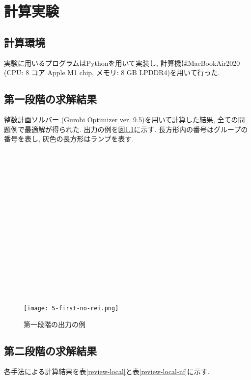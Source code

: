 \chapter{計算実験}\label{computational_result}
\section{計算環境}
実験に用いるプログラムはPythonを用いて実装し, 計算機はMacBookAir2020 (CPU: 8 コア Apple M1 chip, メモリ: 8 GB LPDDR4)を用いて行った. 

\section{第一段階の求解結果}
整数計画ソルバー (Gurobi Optimizer ver. 9.5)を用いて計算した結果, 全ての問題例で最適解が得られた. 
出力の例を図\ref{first-no-rei}に示す. 
長方形内の番号はグループの番号を表し, 灰色の長方形はランプを表す. \\
\\ \\ \\ \\ \\ \\ \\ \\  
\\ \\ \\ \\ \\ \\ \\ \\  
\begin{figure}[h]
    \hspace{2cm}
    \texttt{[image: 5-first-no-rei.png]}
    \caption{第一段階の出力の例}
    \label{first-no-rei}
\end{figure}
\clearpage


\section{第二段階の求解結果}
各手法による計算結果を表\ref{review-local}と表\ref{review-local-nf}に示す. 

